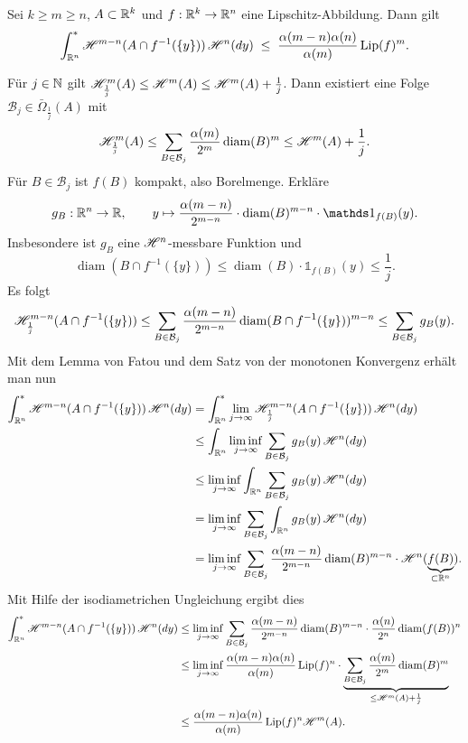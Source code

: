\documentclass[a4paper,twoside,DIV15,BCOR12mm]{scrbook}
\newcommand{\ind}{\mathds 1}
\newcommand{\HM}{\H}
\DeclareMathOperator{\diam}{diam}
\DeclareMathOperator{\Lip}{Lip}
\begin{document}
\begin{lemma}\label{lem:3.10}
Sei \(k\geq m\geq n\), \(A\subset\mathbb{R}^k\) und \(f: \mathbb{R}^k \to \mathbb{R}^n\) eine Lipschitz-Abbildung. Dann gilt
\[
\int_{\MdR^n}^* \HM^{m-n}(A \cap f^{-1}(\{y\}))\, \HM^n(dy) \; \leq \; \frac{\alpha(m-n) \alpha(n)}{\alpha(m)} \Lip(f)^m.
\]
\end{lemma}
\begin{beweis}
Für \(j \in \mathbb{N}\) gilt \(\HM^m_{\frac1j}(A) \leq \HM^m(A) \leq \HM^m(A) + \frac1j\). Dann existiert eine Folge \(\mathcal B_j \in \bar\Omega_{\frac1j}(A)\) mit
\[
\HM^m_{\frac1j}(A) \leq \sum_{B\in\mathcal B_j} \frac{\alpha(m)}{2^m} \diam (B)^m \leq \HM^m(A)+\frac1j.
\]
Für \(B \in \mathcal B_j\) ist \(f(B)\) kompakt, also Borelmenge. Erkläre 
$$g_B: \MdR^n \to \MdR,\qquad  y \mapsto \frac{\alpha(m-n)}{2^{m-n}}\cdot\diam(B)^{m-n}\cdot\ind_{f(B)}(y).
$$ 
Insbesondere ist \(g_B\) eine \(\HM^n\)-messbare Funktion und 
$$
\diam(B\cap f^{-1}(\{y\})) \leq \diam(B) \cdot \ind_{f(B)}(y) \leq \frac1j. 
$$
Es folgt
\[
\HM_{\frac1j}^{m-n}(A\cap f^{-1}(\{y\})) \leq \sum_{B \in \mathcal B_j} \frac{\alpha(m-n)}{2^{m-n}} \diam(B\cap f^{-1}(\{y\}))^{m-n} \leq \sum_{B \in \mathcal B_j} g_B(y).
\]
Mit dem Lemma von Fatou und dem Satz von der monotonen Konvergenz  erhält man nun
\begin{align*}
\int_{\MdR^n}^* \HM^{m-n}(A \cap f^{-1}(\{y\})) \,\HM^n(dy) &= \int_{\MdR^n}^* \lim_{j\to\infty} \HM_{\frac1j}^{m-n}(A\cap f^{-1}(\{y\})) \,\HM^n(dy) \\
&\leq \int_{\MdR^n} \liminf_{j\to\infty} \sum_{B\in\mathcal B_j} g_B(y)\, \HM^n(dy) \\
&\leq \liminf_{j\to\infty} \int_{\MdR^n} \sum_{B\in\mathcal B_j} g_B(y) \,\HM^n(dy) \\
&= \liminf_{j\to\infty} \sum_{B\in\mathcal B_j} \int_{\MdR^n} g_B(y) \,\HM^n(dy) \\
&= \liminf_{j\to\infty} \sum_{B\in\mathcal B_j} \frac{\alpha(m-n)}{2^{m-n}} \diam(B)^{m-n} \cdot \HM^n(\underbrace{f(B)}_{\subset \MdR^n}).
\end{align*}
Mit Hilfe der isodiametrichen Ungleichung ergibt dies
\begin{align*}
\int_{\MdR^n}^* \HM^{m-n}(A \cap f^{-1}(\{y\})) \,\HM^n(dy) 
&\leq \liminf_{j\to\infty} \sum_{B\in\mathcal B_j} \frac{\alpha(m-n)}{2^{m-n}}\diam(B)^{m-n} \cdot \frac{\alpha(n)}{2^n}\diam(f(B))^n \\
&\leq \liminf_{j\to\infty} \frac{\alpha(m-n)\alpha(n)}{\alpha(m)} \Lip(f)^n \cdot \underbrace{\sum_{B\in\mathcal B_j} \frac{\alpha(m)}{2^m}\diam(B)^m}_{\le \HM^m(A) + \frac1j} \\
&\le \frac{\alpha(m-n)\alpha(n)}{\alpha(m)}\Lip(f)^n\HM^m(A).
\end{align*}
\end{beweis}
\end{document}
